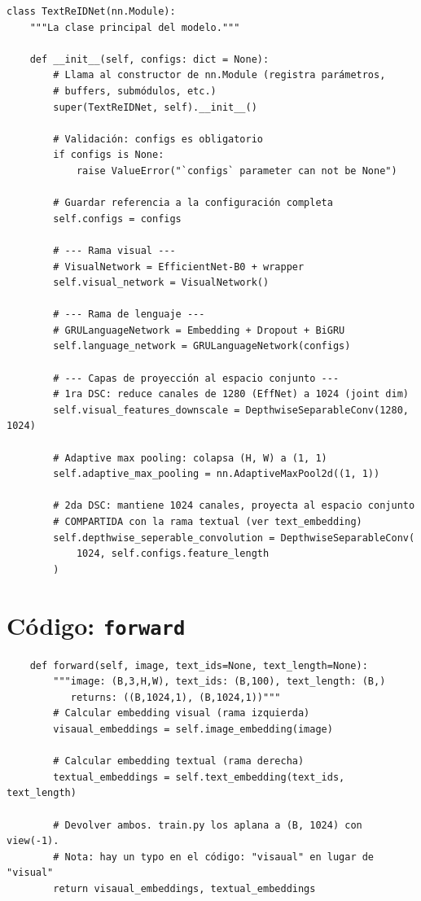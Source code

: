 \begin{verbatim}
class TextReIDNet(nn.Module):
    """La clase principal del modelo."""

    def __init__(self, configs: dict = None):
        # Llama al constructor de nn.Module (registra parámetros,
        # buffers, submódulos, etc.)
        super(TextReIDNet, self).__init__()

        # Validación: configs es obligatorio
        if configs is None:
            raise ValueError("`configs` parameter can not be None")

        # Guardar referencia a la configuración completa
        self.configs = configs

        # --- Rama visual ---
        # VisualNetwork = EfficientNet-B0 + wrapper
        self.visual_network = VisualNetwork()

        # --- Rama de lenguaje ---
        # GRULanguageNetwork = Embedding + Dropout + BiGRU
        self.language_network = GRULanguageNetwork(configs)

        # --- Capas de proyección al espacio conjunto ---
        # 1ra DSC: reduce canales de 1280 (EffNet) a 1024 (joint dim)
        self.visual_features_downscale = DepthwiseSeparableConv(1280, 1024)

        # Adaptive max pooling: colapsa (H, W) a (1, 1)
        self.adaptive_max_pooling = nn.AdaptiveMaxPool2d((1, 1))

        # 2da DSC: mantiene 1024 canales, proyecta al espacio conjunto
        # COMPARTIDA con la rama textual (ver text_embedding)
        self.depthwise_seperable_convolution = DepthwiseSeparableConv(
            1024, self.configs.feature_length
        )
\end{verbatim}

\section{Código: \texttt{forward}}

\begin{verbatim}
    def forward(self, image, text_ids=None, text_length=None):
        """image: (B,3,H,W), text_ids: (B,100), text_length: (B,)
           returns: ((B,1024,1), (B,1024,1))"""
        # Calcular embedding visual (rama izquierda)
        visaual_embeddings = self.image_embedding(image)

        # Calcular embedding textual (rama derecha)
        textual_embeddings = self.text_embedding(text_ids, text_length)

        # Devolver ambos. train.py los aplana a (B, 1024) con view(-1).
        # Nota: hay un typo en el código: "visaual" en lugar de "visual"
        return visaual_embeddings, textual_embeddings
\end{verbatim}

